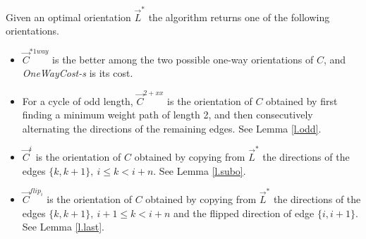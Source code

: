 \begin{definition} Given an optimal orientation $\vec{L}^*$  the algorithm returns one of the 
	following orientations.
	\begin{itemize}
		\item $\vec{C}^{*1way}$ is the better among the two possible one-way orientations of $C$, and \emph{OneWayCost-s} is its cost.
		\item For a cycle of odd length, $\vec{C}^{2+xx}$ is the orientation of $C$ 
		obtained 
		by first finding a minimum weight path of length 2, and then consecutively alternating the directions of the remaining edges. 
		See Lemma \ref{l.odd}.
		\item $\vec{C}^{i}$ is the orientation of $C$ obtained by copying 
		from $\vec{L}^*$ the directions
		of the edges $\{k,k+1\},\ i\leq k <i+n$. See Lemma \ref{l.subo}.
		\item 	$\vec{C}^{flip_i}$ is the orientation of $C$ obtained by copying 
		from $\vec{L}^*$ the directions
		of the edges $\{k,k+1\},\ i+1\leq k <i+n$ and the flipped  
		direction of edge $\{i, i+1\}$.
		See Lemma \ref{l.last}.
	\end{itemize}
\end{definition}

